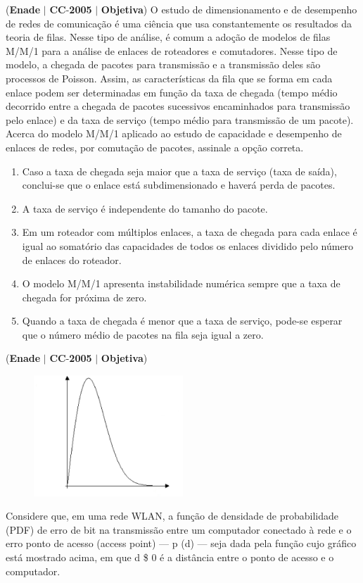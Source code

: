 \documentclass{exam}
\begin{document}
\begin{questions}
\question (\textbf{Enade} $|$ \textbf{CC}-\textbf{2005} $|$ \textbf{Objetiva})
O estudo de dimensionamento e de desempenho de redes de
comunicação é uma ciência que usa constantemente os resultados da
teoria de filas. Nesse tipo de análise, é comum a adoção de modelos
de filas M/M/1 para a análise de enlaces de roteadores e
comutadores. Nesse tipo de modelo, a chegada de pacotes para
transmissão e a transmissão deles são processos de Poisson. Assim,
as características da fila que se forma em cada enlace podem ser
determinadas em função da taxa de chegada (tempo médio decorrido
entre a chegada de pacotes sucessivos encaminhados para
transmissão pelo enlace) e da taxa de serviço (tempo médio para
transmissão de um pacote). Acerca do modelo M/M/1 aplicado ao
estudo de capacidade e desempenho de enlaces de redes, por
comutação de pacotes, assinale a opção correta.
	\begin{enumerate}[label=\alph*)]
		\item  Caso a taxa de chegada seja maior que a taxa de serviço (taxa de
saída), conclui-se que o enlace está subdimensionado e haverá
perda de pacotes.
		\item  A taxa de serviço é independente do tamanho do pacote.
		\item  Em um roteador com múltiplos enlaces, a taxa de chegada para
cada enlace é igual ao somatório das capacidades de todos os
enlaces dividido pelo número de enlaces do roteador.
		\item  O modelo M/M/1 apresenta instabilidade numérica sempre que
a taxa de chegada for próxima de zero.
		\item  Quando a taxa de chegada é menor que a taxa de serviço,
pode-se esperar que o número médio de pacotes na fila seja igual
a zero.
	\end{enumerate}

\question (\textbf{Enade} $|$ \textbf{CC}-\textbf{2005} $|$ \textbf{Objetiva})

\begin{figure}[H]
	\begin{center}
		\includegraphics[width=0.5\textwidth]{CIENCIA_DA_COMPUTACAO_Prova2005-utf8_figuras/fig-0043.jpg}
	\end{center}
\end{figure}
Considere que, em uma rede WLAN, a função de
densidade de probabilidade (PDF) de erro de bit na
transmissão entre um computador conectado à rede e o
erro
ponto de acesso (access point) — p (d) — seja dada
pela função cujo gráfico está mostrado acima, em que d
\$ 0 é a distância entre o ponto de acesso e o
computador.


\end{questions}
\end{document}
